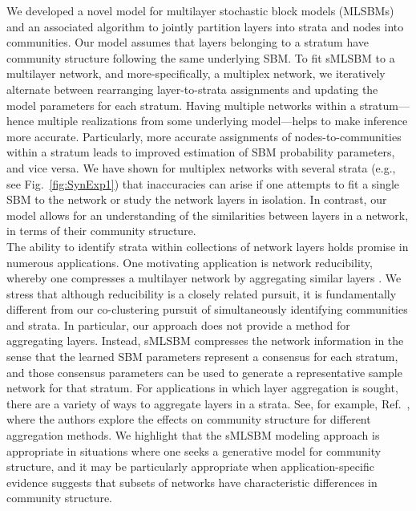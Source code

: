 \indent 
We developed a novel model for multilayer stochastic block models (MLSBMs) and an associated algorithm to jointly partition layers into strata and nodes into communities. Our model assumes that layers belonging to a stratum have community structure following the same underlying SBM. To fit sMLSBM to a multilayer network, and more-specifically, a multiplex network, we iteratively alternate between rearranging layer-to-strata assignments and updating the model parameters for each stratum. Having multiple networks within a stratum---hence multiple realizations from some underlying model---helps to make inference more accurate. Particularly, more accurate assignments of nodes-to-communities within a stratum leads to improved estimation of SBM probability parameters, and vice versa. 
We have shown for multiplex networks with several strata (e.g., see Fig.~\ref{fig:SynExp1}) that inaccuracies can arise if one attempts to fit a single SBM to the network or study the network layers in isolation.
In contrast, our model allows for an understanding of the similarities between layers in a network, in terms of their community structure. 
%
\\\indent
The ability to identify strata within collections of network layers holds promise in numerous applications. 
One motivating application is network reducibility, whereby one compresses a multilayer network by aggregating similar layers \cite{domen}. We stress that although reducibility is a closely related pursuit, it is fundamentally different from our co-clustering pursuit of simultaneously identifying communities and strata. In particular, our approach does not provide a method for aggregating layers. Instead, sMLSBM compresses the network information in the sense that the learned SBM parameters represent a consensus for each stratum, and those consensus parameters can be used to generate a representative sample network for that stratum. For applications in which layer aggregation is sought, there are a variety of ways to aggregate layers in a strata. See, for example, Ref.~\cite{taylor2015enhanced}, where the authors explore the effects on community structure for different aggregation methods. We highlight that the sMLSBM modeling approach is appropriate in situations where one seeks a generative model for community structure, and it may be particularly appropriate when application-specific evidence suggests that subsets of networks have characteristic differences in community structure.

